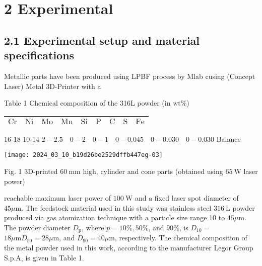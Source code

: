 \documentclass[10pt]{article}
\begin{document}
\section*{2 Experimental}
\subsection*{2.1 Experimental setup and material specifications}
Metallic parts have been produced using LPBF process by Mlab cusing (Concept Laser) Metal 3D-Printer with a

Table 1 Chemical composition of the 316L powder (in wt\%)

\begin{center}
\begin{tabular}{lllllllll}
\hline
$\mathrm{Cr}$ & $\mathrm{Ni}$ & $\mathrm{Mo}$ & $\mathrm{Mn}$ & $\mathrm{Si}$ & $\mathrm{P}$ & $\mathrm{C}$ & $\mathrm{S}$ & $\mathrm{Fe}$ \\
\hline
\end{tabular}
\end{center}

16-18 10-14 $2-2.5 \quad 0-2 \quad 0-1 \quad 0-0.045 \quad 0-0.030 \quad 0-0.030$ Balance

\begin{center}
\texttt{[image: 2024\_03\_10\_b19d26be2529dffb447eg-03]}
\end{center}

Fig. 1 3D-printed $60 \mathrm{~mm}$ high, cylinder and cone parts (obtained using $65 \mathrm{~W}$ laser power)

reachable maximum laser power of $100 \mathrm{~W}$ and a fixed laser spot diameter of $45 \mu \mathrm{m}$. The feedstock material used in this study was stainless steel $316 \mathrm{~L}$ powder produced via gas atomization technique with a particle size range 10 to $45 \mu \mathrm{m}$. The powder diameter $D_{\mathrm{p}}$, where $p=10 \%, 50 \%$, and $90 \%$, is $D_{10}=$ $18 \mu \mathrm{m} D_{50}=28 \mu \mathrm{m}$, and $D_{90}=40 \mu \mathrm{m}$, respectively. The chemical composition of the metal powder used in this work, according to the manufacturer Legor Group S.p.A, is given in Table 1.
\end{document}
